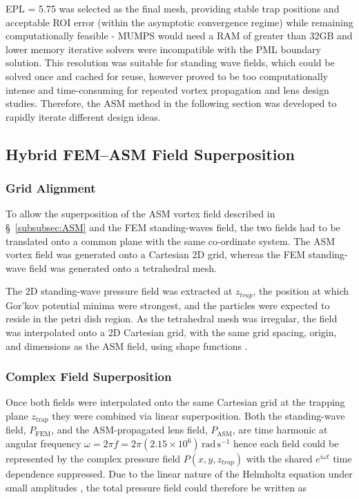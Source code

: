 \documentclass[11pt,a4paper]{article}
\begin{document}
\noindent EPL = 5.75 was  selected as the final mesh,  providing stable trap positions and acceptable ROI error (within the asymptotic convergence regime) while remaining computationally feasible - MUMPS would need a RAM of greater than 32GB and lower memory iterative solvers were incompatible with the PML boundary solution. This resolution was suitable for standing wave fields, which could be solved once and cached for reuse, however proved to be too computationally intense and time-consuming for repeated vortex propagation and lens design studies. Therefore, the ASM method in the following section was developed to rapidly iterate different design ideas. 


\subsection{Hybrid FEM--ASM Field Superposition}
\label{subsubsec:hybrid-fem-asm}

\subsubsection{Grid Alignment}

To allow the superposition of the ASM vortex field described in \S~\ref{subsubsec:ASM} and the FEM standing-waves field, the two fields had to be translated onto a common plane with the same co-ordinate system. The ASM vortex field was generated onto a Cartesian 2D grid, whereas the FEM standing-wave field was generated onto a tetrahedral mesh. 

The 2D standing-wave pressure field was extracted at $z_{trap}$, the position at which Gor'kov potential minima were strongest, and the particles were expected to reside in the petri dish region. As the tetrahedral mesh was irregular, the field was interpolated onto a 2D Cartesian grid, with the same grid spacing, origin, and dimensions as the ASM field, using shape functions \cite{ihlenburg1998finite, logg2012fenics}. 
\\

\subsubsection{Complex Field Superposition}

Once both fields were interpolated onto the same Cartesian grid at the trapping plane $z_{\mathrm{trap}}$ they were combined via linear superposition. Both the standing-wave field, $P_{\mathrm{FEM}}$,  and the ASM-propagated lens field, $P_{\mathrm{ASM}}$,  are time harmonic at angular frequency $\omega = 2\pi f = 2\pi(2.15\times10^6)\,\mathrm{rad\,s^{-1}}$ hence each field could be represented by the complex pressure field $P(x,y,z_{trap})$ with the shared $e^{i \omega t}$ time dependence suppressed. Due to the linear nature of the Helmholtz equation under small amplitudes \cite{ihlenburg1998finite, kinsler2000acoustics}, the total pressure field could therefore be written as
\end{document}
